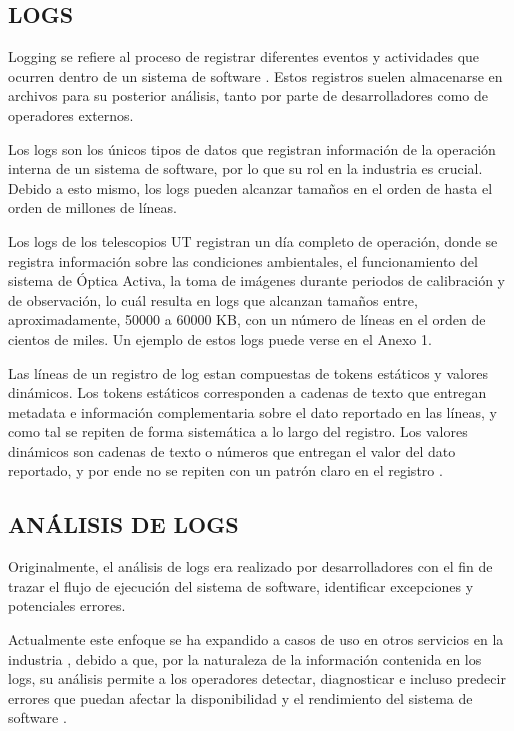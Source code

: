 \subsection{LOGS}
Logging se refiere al proceso de registrar diferentes eventos y actividades que ocurren dentro de un sistema de software \cite{jayathilake2011mind}. Estos registros suelen almacenarse en archivos para su posterior análisis, tanto por parte de desarrolladores como de operadores externos.

Los logs son los únicos tipos de datos que registran información de la operación interna de un sistema de software, por lo que su rol en la industria es crucial. Debido a esto mismo, los logs pueden alcanzar tamaños en el orden de hasta el orden de millones de líneas\cite{ma2023automatic}.

Los logs de los telescopios UT registran un día completo de operación, donde se registra información sobre las condiciones ambientales, el funcionamiento del sistema de Óptica Activa, la toma de imágenes durante periodos de calibración y de observación, lo cuál resulta en logs que alcanzan tamaños entre, aproximadamente, 50000 a 60000 KB, con un número de líneas en el orden de cientos de miles. Un ejemplo de estos logs puede verse en el Anexo 1.

Las líneas de un registro de log estan compuestas de tokens estáticos y valores dinámicos. Los tokens estáticos corresponden a cadenas de texto que entregan metadata e información complementaria sobre el dato reportado en las líneas, y como tal se repiten de forma sistemática a lo largo del registro. Los valores dinámicos son cadenas de texto o números que entregan el valor del dato reportado, y por ende no se repiten con un patrón claro en el registro \cite{ma2023automatic}. 

\subsection{ANÁLISIS DE LOGS}
Originalmente, el análisis de logs era realizado por desarrolladores con el fin de trazar el flujo de ejecución del sistema de software, identificar excepciones y potenciales errores. \cite{jayathilake2011mind}

Actualmente este enfoque se ha expandido a casos de uso en otros servicios en la industria \cite{ma2023automatic}, debido a que, por la naturaleza de la información contenida en los logs, su análisis permite a los operadores detectar, diagnosticar e incluso predecir errores que puedan afectar la disponibilidad y el rendimiento del sistema de software \cite{jayathilake2011mind}.

